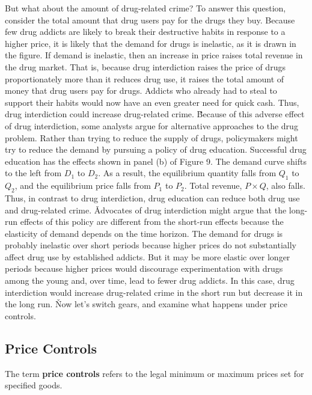 
But what about the amount of drug-related crime? To answer this question, consider the total amount that drug users
pay for the drugs they buy. Because few drug addicts are likely to break their destructive habits in response to a
higher price, it is likely that the demand for drugs is inelastic, as it is drawn in the figure. If demand is
inelastic, then an increase in price raises total revenue in the drug market. That is, because drug interdiction
raises the price of drugs proportionately more than it reduces drug use, it raises the total amount of money that
drug users pay for drugs. Addicts who already had to steal to support their habits would now have an even greater
need for quick cash. Thus, drug interdiction could increase drug-related crime. \v

Because of this adverse effect of drug interdiction, some analysts argue for alternative approaches to the drug
problem. Rather than trying to reduce the supply of drugs, policymakers might try to reduce the demand by pursuing a
policy of drug education. Successful drug education has the effects shown in panel (b) of Figure 9. The demand curve
shifts to the left from $D_1$ to $D_2$. As a result, the equilibrium quantity falls from $Q_1$ to $Q_2$, and the
equilibrium price falls from $P_1$ to $P_2$. Total revenue, $P \times Q$, also falls. Thus, in contrast to drug
interdiction, drug education can reduce both drug use and drug-related crime. \v

Advocates of drug interdiction might argue that the long-run effects of this policy are different from the short-run
effects because the elasticity of demand depends on the time horizon. The demand for drugs is probably inelastic over
short periods because higher prices do not substantially affect drug use by established addicts. But it may be more
elastic over longer periods because higher prices would discourage experimentation with drugs among the young and,
over time, lead to fewer drug addicts. In this case, drug interdiction would increase drug-related crime in the short
run but decrease it in the long run. \v

Now let's switch gears, and examine what happens under price controls.

\subsection{Price Controls}

The term \textbf{price controls} refers to the legal minimum or maximum prices set for specified goods.
\ed

